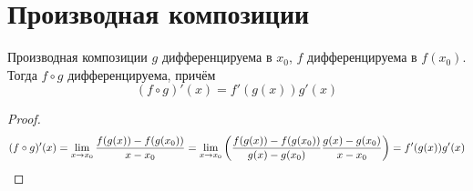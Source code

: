 \section{Производная композиции}

\begin{theorem}{Производная композиции}
$g$ дифференцируема в $x_0$, $f$ дифференцируема в $f(x_0)$. Тогда $f \circ g$ дифференцируема, причём
$$(f \circ g)'(x) = f'(g(x)) g'(x)$$
\end{theorem}
\begin{proof}
$$(f \circ g)'(x) = \lim_{x\rightarrow x_0} \frac{f(g(x)) - f(g(x_0))}{x-x_0} = \lim_{x\rightarrow x_0} \left(\frac{f(g(x)) - f(g(x_0))}{g(x)-g(x_0)} \frac{g(x) - g(x_0)}{x-x_0}\right) = f'(g(x)) g'(x)$$
\end{proof}